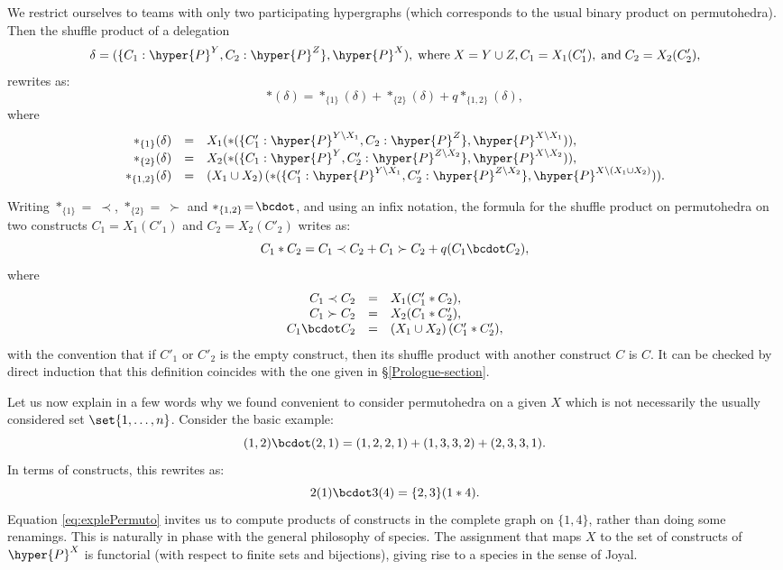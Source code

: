 \begin{example} \label{permutohedra- }
We restrict ourselves to teams with only two participating hypergraphs (which corresponds to the usual binary product on permutohedra). Then 
the   shuffle product of a delegation $$\delta=(\{C_1 : \hyper{P}^Y, C_2 :\hyper{P}^Z\},\hyper{P}^X),\;\mbox{where}\; X=Y \cup Z,
C_1=X_1(C'_1),\; \mbox{and}\; C_2=X_2(C'_2),$$
rewrites as:
$$\ast(\delta) = \ast_{\{1\}}(\delta) + \ast_{\{2\}}(\delta)+q\ast_{\{1,2\}}(\delta),$$ where
$$\begin{array}{rcl}
\ast_{\{1\}}(\delta) &=&X_1(\ast(\{C'_1 : \hyper{P}^{Y \backslash X_1}, C_2 : \hyper{P}^Z\}, \hyper{P}^{X \backslash X_1})), \\
\ast_{\{2\}}(\delta) &=& X_2(\ast(\{C_1 : \hyper{P}^{Y }, C'_2 : \hyper{P}^{Z \backslash X_2}\}, \hyper{P}^{X \backslash X_2})),\\
\ast_{\{1,2\}}(\delta) &=&\left(X_1 \cup X_2 \right)(\ast(\{C'_1 : \hyper{P}^{Y \backslash X_1}, C'_2 : \hyper{P}^{Z \backslash X_2}\}, \hyper{P}^{X \backslash \left(X_1 \cup X_2 \right)})).
\end{array}$$

 Writing $\ast_{\{1\}}\!=\:\prec$, $\ast_{\{2\}}\!=\:\succ$ and $\ast_{\{1,2\}}\!=\!\bcdot$, and using an infix notation, the formula for the   shuffle product on permutohedra  on two constructs $C_1=X_1(C'_1)$ and $C_2=X_2(C'_2)$ writes as:
$$C_1 \ast C_2 = C_1 \prec C_2+C_1 \succ C_2+q (C_1 \bcdot C_2),$$ where
$$\begin{array}{rcl}
C_1 \prec C_2 &=&X_1(C'_1 \ast  C_2 ), \\
C_1 \succ C_2 &=&X_2(C_1 \ast C'_2),\\
C_1 \bcdot C_2&=&\left(X_1 \cup X_2 \right)(C'_1 \ast C'_2),
\end{array}$$
with the convention that if $C'_1$ or $C'_2$ is the empty construct, then its   shuffle product with another  construct $C$ is $C$. It can be checked by direct induction that this  definition coincides with the one given in  \S\ref{Prologue-section}. \demo

\end{example}


\begin{remark} \label{species-remark}
 Let us now explain in a few words why we found convenient to consider permutohedra on a given $X$ which is not necessarily  the usually considered set $\set{1,\ldots,n}$.  
 Consider the basic example:
\begin{equation}
(1,2)\bcdot (2,1) = (1,2,2,1)+ (1,3,3,2) + (2,3,3,1).
\end{equation}
In terms of constructs, this rewrites as:
\begin{equation} \label{eq:explePermuto}
2(1)\bcdot 3(4) = \{2,3\} (1 \ast 4).
\end{equation}
 Equation \ref{eq:explePermuto} invites us to compute products of constructs in the complete graph on $\{1,4\}$, rather than doing some renamings.
 This  is naturally in phase with the general philosophy of species. The assignment that maps $X$ to the set of constructs of $\hyper{P}^X$
 is functorial (with respect to finite sets and bijections), giving rise to a species in the sense of Joyal. 
 \end{remark}

